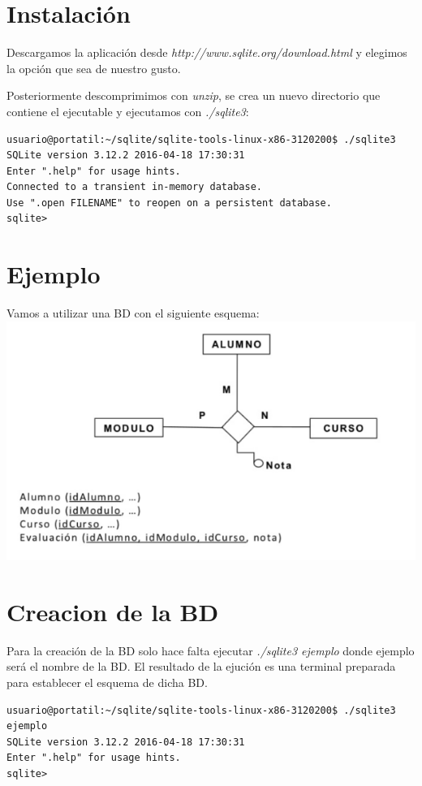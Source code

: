 \documentclass[4paper]{article}
\begin{document}
\section{Instalación}
Descargamos la aplicación desde \emph{http://www.sqlite.org/download.html} y elegimos la opción que sea de nuestro gusto.\par
Posteriormente descomprimimos con \emph{unzip}, se crea un nuevo directorio que contiene el ejecutable y ejecutamos con \emph{./sqlite3}:
\begin{verbatim}
usuario@portatil:~/sqlite/sqlite-tools-linux-x86-3120200$ ./sqlite3
SQLite version 3.12.2 2016-04-18 17:30:31
Enter ".help" for usage hints.
Connected to a transient in-memory database.
Use ".open FILENAME" to reopen on a persistent database.
sqlite>
\end{verbatim}

\section{Ejemplo}
Vamos a utilizar una BD con el siguiente esquema:\\
\includegraphics[scale=0.5]{ejemplo.png}

\section{Creacion de la BD}
Para la creación de la BD solo hace falta ejecutar \emph{./sqlite3 ejemplo} donde ejemplo será el nombre de la BD. El resultado de la ejución es una terminal preparada para establecer el esquema de dicha BD.
\begin{verbatim}
usuario@portatil:~/sqlite/sqlite-tools-linux-x86-3120200$ ./sqlite3 ejemplo
SQLite version 3.12.2 2016-04-18 17:30:31
Enter ".help" for usage hints.
sqlite>
\end{verbatim}
\end{document}

